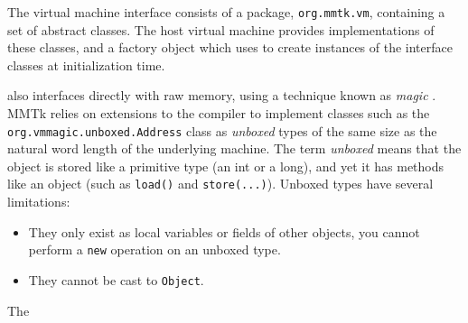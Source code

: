 The virtual machine interface consists of a package, \lstinline|org.mmtk.vm|,
containing a set of abstract classes.  The host virtual machine provides
implementations of these classes, and a factory object which \mmtk uses to
create instances of the interface classes at initialization time.

\mmtk also interfaces directly with raw memory, using a technique known as \emph{magic} \citep{FBC+:09}.
MMTk relies on extensions to the \java compiler to implement classes such as the 
\lstinline|org.vmmagic.unboxed.Address| class as \emph{unboxed} types of the same size as the natural
word length of the underlying machine.  The term \emph{unboxed} means that the object is stored
like a primitive type (an int or a long), and yet it has methods like an object (such as \lstinline|load()| and 
\lstinline|store(...)|).  Unboxed types have several limitations:
\begin{itemize}
  \item They only exist as local variables or fields of other objects, \ie you
  cannot perform a \lstinline|new| operation on an unboxed type.
  \item They cannot be cast to \lstinline|Object|.
\end{itemize}
The 

